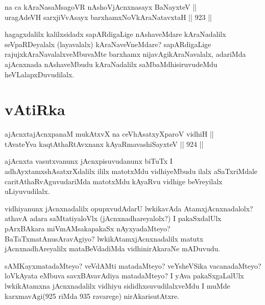 \begin{shl}
na ca kAraNasaMsagoVR nAshoV\s jAcnxnasayx BaNayxteV || \\
uragAdeVH sarxjiVvAsayx barxhamxNoV\s kAraNatavxtaH ||  923 ||  
\end{shl}

\begin{artha}
hagagxdalilx kalilxsidadx sapARdigaLige nAshaveMdare kAraNadalilx seVpaRDeyalalx (layavalalx) kAraNaveVneMdare? sapARdigaLige rajujxkAraNavalalxveMbuvaMte barxhamx nijavAgikAraNavalalx, adariMda ajAcnxnada nAshaveMbudu kAraNadalilx saMbaMdhisiruvudeMdu heVLalapxDuvudilalx.
\end{artha}

\section*{vAtiRka}


\begin{shl}
ajAcnxtajAcnxpanaM mukAtxvX na ceVhAsatxyXparoV vidhiH || \\
tAvateYva kaqtAthaRtAvxnanx kAyaRmavashiSayxteV ||  924 ||  
\end{shl}

\begin{artha}
ajAcnxta vasutxvanunx jAcnxpisuvudanunx biTuTx I adhAyxtamxshAsatxrXdalilx ililx matotxMdu vidhiyeMbudu ilalx aSaTxriMdale caritAthaRvAguvudariMda matotxMdu kAyaRvu vidhige beVreyilalx uLiyuvudilalx.
\end{artha}

\begin{artha}
vidhiyanunx jAcnxnadalilx opupxvudAdarU lwkikavAda AtamxjAcnxnadalolx? athavA adara saMtatiyaloVlx (jAcnxnadhareyalolx?) I pakaSxdalUlx pArxBAkara miVmAMsakapakaSx nAyxyadaMteyo? BaTaTxmatAnusAravAgiyo? lwkikAtamxjAcnxnadalilx matutx jAcnxnadhAreyalilx mataBeVdadiMda vidhinirAkaraNe mADuvudu.
\end{artha}

\begin{artha}
sAMKayxmatadaMteyo? veVdAMti matadaMteyo? veYsheVSika vacanadaMteyo? loVkAyata eMbuva savxBAvavAdiya matadaMteyo? I yAva pakaSxgaLalUlx lwkikAtamxna jAcnxnadalilx vidhiyu sididhxsuvudilalxveMdu I muMde karxmavAgi(925 riMda 935 ravarege) nirAkarisutAtxre.
\end{artha}


